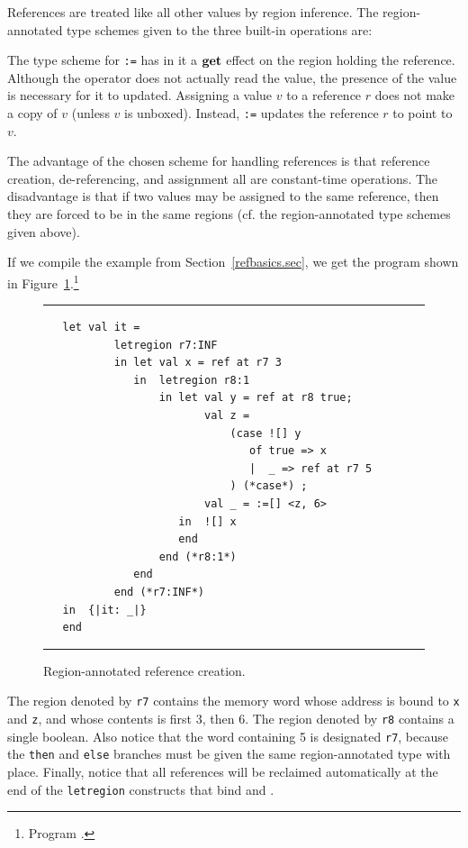 \documentclass[12pt]{book}
\begin{document}
References are treated like all other values by region inference.  The
region-annotated type schemes given to the three built-in operations
are: \medskip

\medskip

\noindent
The type scheme for \verb+:=+ has in it a $\mathop{\bf get}\nolimits$ effect on the region
holding the reference. Although the operator does not actually read
the value, the presence of the value is necessary for it to updated.
Assigning a value $v$ to a reference $r$ does not make a copy of $v$
(unless $v$ is unboxed). Instead, \verb+:=+ updates the reference $r$
to point to $v$.

The advantage of the chosen scheme for handling references is that
reference creation, de-referencing, and assignment all are
constant-time operations. The disadvantage is that if two values may
be assigned to the same reference, then they are forced to be in the
same regions (cf. the region-annotated type schemes given above).

If we compile the example from Section~\ref{refbasics.sec}, we get the
program shown in Figure~\ref{otherrefs.fig}.\footnote{Program
  .}
\begin{figure}
\hrule
\medskip
\begin{verbatim}
   let val it = 
           letregion r7:INF 
           in let val x = ref at r7 3
              in  letregion r8:1 
                  in let val y = ref at r8 true; 
                         val z = 
                             (case ![] y 
                                of true => x
                                |  _ => ref at r7 5
                             ) (*case*) ; 
                         val _ = :=[] <z, 6>
                     in  ![] x
                     end  
                  end (*r8:1*)
              end  
           end (*r7:INF*)
   in  {|it: _|}
   end 
\end{verbatim}
\caption{Region-annotated reference creation.}
\label{otherrefs.fig}
\medskip
\hrule
\end{figure}
The region denoted by {\tt r7} contains the memory word whose address
is bound to {\tt x} and {\tt z}, and whose contents is first 3, then
6.  The region denoted by {\tt r8} contains a single boolean.  Also
notice that the word containing 5 is designated {\tt r7}, because the
{\tt then} and {\tt else} branches must be given the same
region-annotated type with place. Finally, notice that all references
will be reclaimed automatically at the end of the {\tt letregion}
constructs that bind  and .
\end{document}
